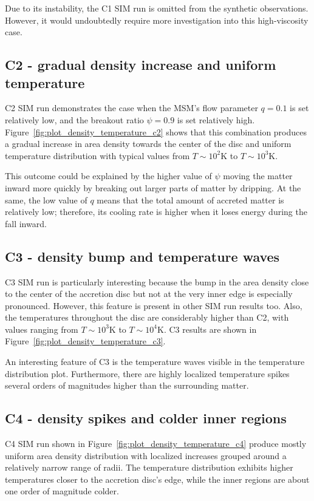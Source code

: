     Due to its instability, the C1 SIM run is omitted from the synthetic observations. However, it would undoubtedly require more investigation into this high-viscosity case.  

\subsection{C2 - gradual density increase and uniform temperature}
    C2 SIM run demonstrates the case when the MSM's flow parameter $q = 0.1$ is set relatively low, and the breakout ratio $\psi = 0.9$ is set relatively high. Figure~\ref{fig:plot_density_temperature_c2} shows that this combination produces a gradual increase in area density towards the center of the disc and uniform temperature distribution with typical values from $T \sim 10^2 \si{\kelvin}$ to $T \sim 10^3 \si{\kelvin}$. 

    This outcome could be explained by the higher value of $\psi$ moving the matter inward more quickly by breaking out larger parts of matter by dripping. At the same, the low value of $q$ means that the total amount of accreted matter is relatively low; therefore, its cooling rate is higher when it loses energy during the fall inward. 

\subsection{C3 - density bump and temperature waves}
    C3 SIM run is particularly interesting because the bump in the area density close to the center of the accretion disc but not at the very inner edge is especially pronounced. However, this feature is present in other SIM run results too. Also, the temperatures throughout the disc are considerably higher than C2, with values ranging from $T \sim 10^3\si{\kelvin}$ to $T \sim 10^4\si{\kelvin}$. C3 results are shown in Figure~\ref{fig:plot_density_temperature_c3}. 

    An interesting feature of C3 is the temperature waves visible in the temperature distribution plot. Furthermore, there are highly localized temperature spikes several orders of magnitudes higher than the surrounding matter.

\subsection{C4 - density spikes and colder inner regions}
    C4 SIM run shown in Figure~\ref{fig:plot_density_temperature_c4} produce mostly uniform area density distribution with localized increases grouped around a relatively narrow range of radii. The temperature distribution exhibits higher temperatures closer to the accretion disc's edge, while the inner regions are about one order of magnitude colder. 

